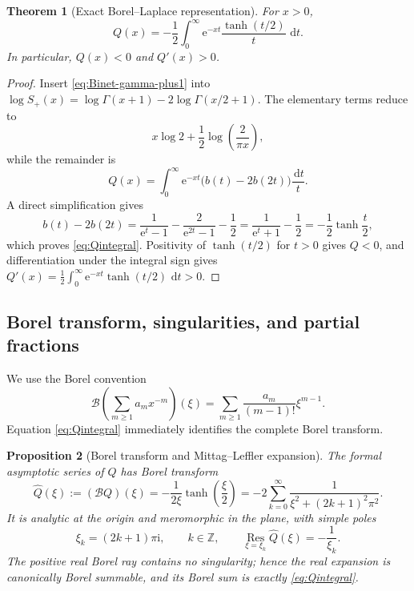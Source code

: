 \documentclass[11pt]{article}
\newtheorem{theorem}{Theorem}[section]
\newtheorem{proposition}[theorem]{Proposition}
\theoremstyle{definition}
\theoremstyle{remark}
\newcommand{\dd}{\,\mathrm d}
\newcommand{\e}{\mathrm e}
\newcommand{\ii}{\mathrm i}
\newcommand{\Borel}{\mathcal B}
\newcommand{\Res}{\operatorname*{Res}}
\begin{document}
\begin{theorem}[Exact Borel--Laplace representation]\label{thm:Qintegral}
For $x>0$,
\begin{equation}\label{eq:Qintegral}
 Q(x)=-\frac12\int_0^\infty \e^{-xt}\frac{\tanh(t/2)}{t}\,\dd t.
\end{equation}
In particular, $Q(x)<0$ and $Q'(x)>0$.
\end{theorem}

\begin{proof}
Insert \eqref{eq:Binet-gamma-plus1} into
$\log S_+(x)=\log\Gamma(x+1)-2\log\Gamma(x/2+1)$.  The elementary terms reduce to
\[
 x\log2+\frac12\log\!\left(\frac{2}{\pi x}\right),
\]
while the remainder is
\[
 Q(x)=\int_0^\infty \e^{-xt}\bigl(b(t)-2b(2t)\bigr)\frac{\dd t}{t}.
\]
A direct simplification gives
\[
 b(t)-2b(2t)
 =\frac{1}{\e^t-1}-\frac{2}{\e^{2t}-1}-\frac12
 =\frac{1}{\e^t+1}-\frac12
 =-\frac12\tanh\!\frac t2,
\]
which proves \eqref{eq:Qintegral}.  Positivity of $\tanh(t/2)$ for $t>0$ gives $Q<0$, and differentiation under the integral sign gives
$Q'(x)=\frac12\int_0^\infty\e^{-xt}\tanh(t/2)\,\dd t>0$.
\end{proof}

\subsection{Borel transform, singularities, and partial fractions}

We use the Borel convention
\begin{equation}\label{eq:Borel-convention}
 \Borel\!\left(\sum_{m\ge1}a_mx^{-m}\right)(\xi)
 =\sum_{m\ge1}\frac{a_m}{(m-1)!}\xi^{m-1}.
\end{equation}
Equation \eqref{eq:Qintegral} immediately identifies the complete Borel transform.

\begin{proposition}[Borel transform and Mittag--Leffler expansion]\label{prop:Borel}
The formal asymptotic series of $Q$ has Borel transform
\begin{equation}\label{eq:Borel-Q}
 \widehat Q(\xi):=(\Borel Q)(\xi)
 =-\frac{1}{2\xi}\tanh\!\left(\frac\xi2\right)
 =-2\sum_{k=0}^\infty
 \frac{1}{\xi^2+(2k+1)^2\pi^2}.
\end{equation}
It is analytic at the origin and meromorphic in the plane, with simple poles
\begin{equation}\label{eq:Borel-poles}
 \xi_k=(2k+1)\pi\ii,\qquad k\in\mathbb Z,
 \qquad
 \Res_{\xi=\xi_k}\widehat Q(\xi)=-\frac1{\xi_k}.
\end{equation}
The positive real Borel ray contains no singularity; hence the real expansion is canonically Borel summable, and its Borel sum is exactly \eqref{eq:Qintegral}.
\end{proposition}
\end{document}
